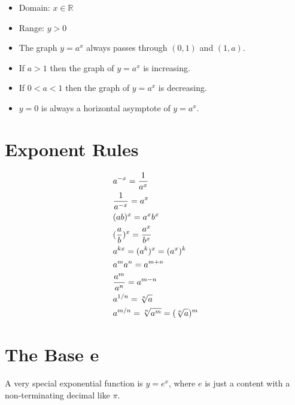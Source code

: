 \begin{itemize}
	\item
	      Domain: $ x \in \mathbb R $

	\item
	      Range: $ y > 0 $

	\item
	      The graph $ y = a^x $ always passes through $ (0, 1) $ and $ (1, a) $.

	\item
	      If $ a > 1$ then the graph of $ y = a^x $ is increasing.

	\item
	      If $ 0 < a < 1 $ then the graph of  $ y = a^x $ is decreasing.

	\item
	      $ y = 0 $ is always a horizontal asymptote of $ y = a^x $.
\end{itemize}

\section{Exponent Rules}

\begin{theorem}
	\begin{align}
		 & a^{-x} = {1 \over a^x}                    \\
		 & {1 \over a^{-x}} = a^x                    \\
		 & (ab)^x = a^xb^x                           \\
		 & ({a \over b})^x = {a^x \over b^x}         \\
		 & a^{kx} = (a^k)^x = (a^x)^k                \\
		 & a^ma^n = a^{m+n}                          \\
		 & {a^m \over a^n} = a^{m-n}                 \\
		 & a^{1/n} = \sqrt[n]{a}                     \\
		 & a^{m/n} = \sqrt[n]{a^m} = (\sqrt[n]{a})^m
	\end{align}
\end{theorem}

\section{The Base e}

A very special exponential function is $ y = e^x $, where $ e $ is just a content with a non-terminating decimal like $ \pi $. \\

